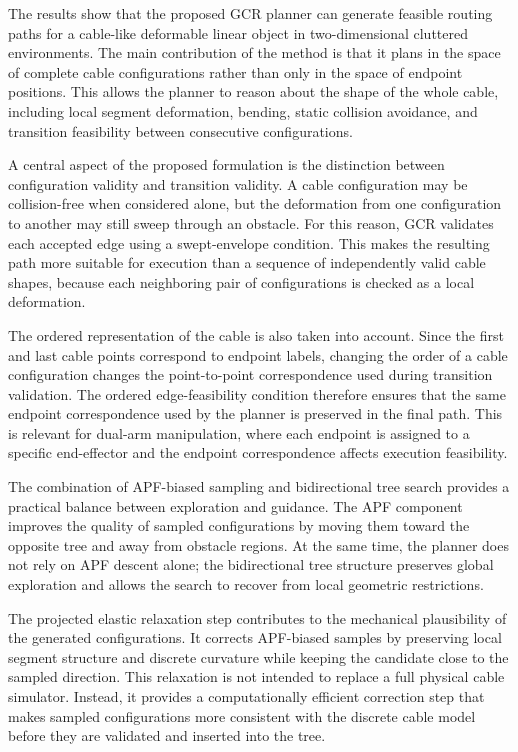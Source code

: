 \documentclass{pas}
\begin{document}
The results show that the proposed GCR planner can generate feasible routing
paths for a cable-like deformable linear object in two-dimensional cluttered
environments. The main contribution of the method is that it plans in the space
of complete cable configurations rather than only in the space of endpoint
positions. This allows the planner to reason about the shape of the whole cable,
including local segment deformation, bending, static collision avoidance, and
transition feasibility between consecutive configurations.

A central aspect of the proposed formulation is the distinction between
configuration validity and transition validity. A cable configuration may be
collision-free when considered alone, but the deformation from one configuration
to another may still sweep through an obstacle. For this reason, GCR validates
each accepted edge using a swept-envelope condition. This makes the resulting
path more suitable for execution than a sequence of independently valid cable
shapes, because each neighboring pair of configurations is checked as a local
deformation.

The ordered representation of the cable is also taken into account. Since the first and last cable points correspond to endpoint labels, changing the order of a cable configuration changes the point-to-point correspondence used during transition validation. The ordered edge-feasibility condition therefore ensures that the same endpoint correspondence used by the planner is preserved in the final path.
This is relevant for dual-arm manipulation, where each endpoint is assigned to a specific end-effector and the endpoint correspondence affects execution feasibility.

The combination of APF-biased sampling and bidirectional tree search provides a
practical balance between exploration and guidance. The APF component improves
the quality of sampled configurations by moving them toward the opposite tree
and away from obstacle regions. At the same time, the planner does not rely on
APF descent alone; the bidirectional tree structure preserves global exploration
and allows the search to recover from local geometric restrictions.

The projected elastic relaxation step contributes to the mechanical plausibility
of the generated configurations. It corrects APF-biased samples by preserving
local segment structure and discrete curvature while keeping the candidate close
to the sampled direction. This relaxation is not intended to replace a full
physical cable simulator. Instead, it provides a computationally efficient
correction step that makes sampled configurations more consistent with the
discrete cable model before they are validated and inserted into the tree.
\end{document}
